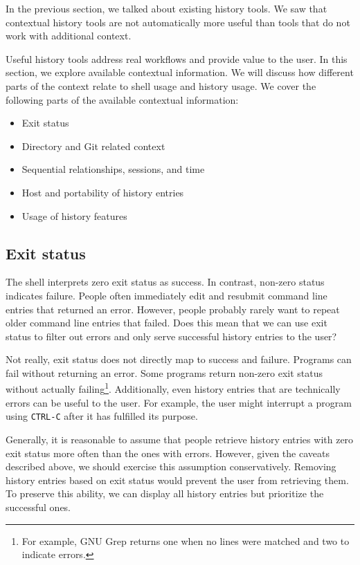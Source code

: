 In the previous section, we talked about existing history tools. We saw that contextual history tools are not automatically more useful than tools that do not work with additional context. 

Useful history tools address real workflows and provide value to the user.
In this section, we explore available contextual information. We will discuss how different parts of the context relate to shell usage and history usage. %
We cover the following parts of the available contextual information:

\begin{itemize}
    \item Exit status
    \item Directory and Git related context
    \item Sequential relationships, sessions, and time
    \item Host and portability of history entries
    \item Usage of history features
\end{itemize}

\subsection{Exit status}

The shell interprets zero exit status as success. In contrast, non-zero status indicates failure.\cite{bashman} People often immediately edit and resubmit command line entries that returned an error. However, people probably rarely want to repeat older command line entries that failed. Does this mean that we can use exit status to filter out errors and only serve successful history entries to the user?

Not really, exit status does not directly map to success and failure. Programs can fail without returning an error. Some programs return non-zero exit status without actually failing\footnote{For example, GNU Grep returns one when no lines were matched and two to indicate errors.\cite{man-grep}}. 
Additionally, even history entries that are technically errors can be useful to the user. For example, the user might interrupt a program using \verb|CTRL-C| after it has fulfilled its purpose.

Generally, it is reasonable to assume that people retrieve history entries with zero exit status more often than the ones with errors. However, given the caveats described above, we should exercise this assumption conservatively. Removing history entries based on exit status would prevent the user from retrieving them. To preserve this ability, we can display all history entries but prioritize the successful ones.

